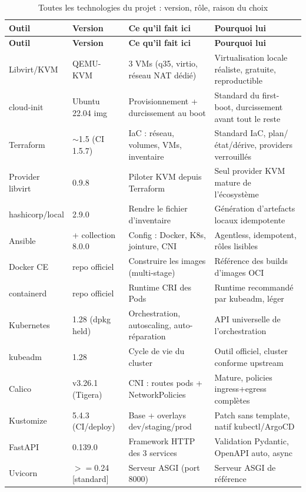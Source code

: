 \documentclass[11pt,a4paper]{article}
\begin{document}
{\small
\begin{longtable}{@{}p{3.1cm}p{2.0cm}p{4.6cm}p{4.6cm}@{}}
\caption{Toutes les technologies du projet : version, rôle, raison du choix}\label{tab:recap}\\
\toprule
\textbf{Outil} & \textbf{Version} & \textbf{Ce qu'il fait ici} & \textbf{Pourquoi lui} \\
\midrule
\endfirsthead
\toprule
\textbf{Outil} & \textbf{Version} & \textbf{Ce qu'il fait ici} & \textbf{Pourquoi lui} \\
\midrule
\endhead
\bottomrule
\endlastfoot
Libvirt/KVM & QEMU-KVM & 3 VMs (q35, virtio, réseau NAT dédié) & Virtualisation locale réaliste, gratuite, reproductible \\
cloud-init & Ubuntu 22.04 img & Provisionnement + durcissement au boot & Standard du first-boot, durcissement avant tout le reste \\
Terraform & $\sim$1.5 (CI 1.5.7) & IaC : réseau, volumes, VMs, inventaire & Standard IaC, plan/état/dérive, providers verrouillés \\
Provider libvirt & 0.9.8 & Piloter KVM depuis Terraform & Seul provider KVM mature de l'écosystème \\
hashicorp/local & 2.9.0 & Rendre le fichier d'inventaire & Génération d'artefacts locaux idempotente \\
Ansible & + collection 8.0.0 & Config : Docker, K8s, jointure, CNI & Agentless, idempotent, rôles lisibles \\
Docker CE & repo officiel & Construire les images (multi-stage) & Référence des builds d'images OCI \\
containerd & repo officiel & Runtime CRI des Pods & Runtime recommandé par kubeadm, léger \\
Kubernetes & 1.28 (dpkg held) & Orchestration, autoscaling, auto-réparation & API universelle de l'orchestration \\
kubeadm & 1.28 & Cycle de vie du cluster & Outil officiel, cluster conforme upstream \\
Calico & v3.26.1 (Tigera) & CNI : routes pods + NetworkPolicies & Mature, policies ingress+egress complètes \\
Kustomize & 5.4.3 (CI/deploy) & Base + overlays dev/staging/prod & Patch sans template, natif kubectl/ArgoCD \\
FastAPI & 0.139.0 & Framework HTTP des 3 services & Validation Pydantic, OpenAPI auto, async \\
Uvicorn & $>=$0.24 [standard] & Serveur ASGI (port 8000) & Serveur ASGI de référence \\

\end{longtable}}
\end{document}

